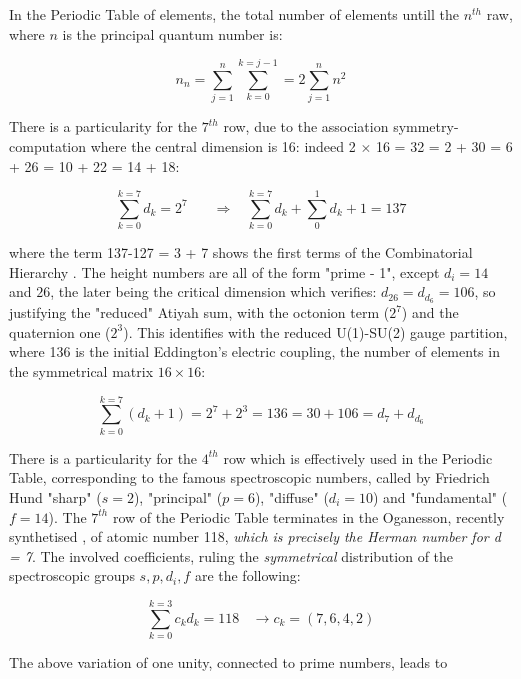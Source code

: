 \documentclass[a4paper,9pt]{article}
\newcounter{row}
\begin{document}
In the Periodic Table of elements, the total number of elements untill the $n^{th}$ raw, where $n$ is the principal quantum number is:

\begin{equation}\label{Eq46}
n_n = \sum _{j=1}^{n}  \sum_{k=0}^{k=j-1} = 2 \sum _{j=1}^{n} n^2
 \end{equation}

There is a particularity for the $7^{th}$ row, due to the association symmetry-computation where the central dimension is 16: indeed 2 $\times$ 16 = 32 = 2 + 30 = 6 + 26 = 10 + 22 = 14 + 18:  

\begin{equation}\label{Eq47}
 \sum_{k=0}^{k=7} d_k = 2^7~~~~~~~~\Rightarrow~~~~  \sum_{k=0}^{k=7} d_k + \sum_0^1{d_k + 1} = 137
 \end{equation}

 where the term 137-127 = 3 + 7 shows the first terms of the Combinatorial Hierarchy \cite{Bastin}. The height numbers are all of the form "prime - 1", except $d_i = 14$ and $26$, the later being the critical dimension which verifies: $ d_{26} = d_{d_6} = 106 $, so justifying the "reduced" Atiyah sum, with the octonion term ($2^7$) and the quaternion one ($2^3$). This identifies with the reduced U(1)-SU(2) gauge partition, where 136 is the initial Eddington's electric coupling, the number of elements in the symmetrical matrix $16\times16$: 

\begin{equation}\label{Eq48}
 \sum_{k=0}^{k=7} (d_k+1)= 2^7 + 2^3 = 136 = 30 + 106 = d_7 + d_{d_6}
 \end{equation}
  

There is a particularity for the $4^{th}$ row which is effectively used in the Periodic Table, corresponding to the famous spectroscopic numbers, called by Friedrich Hund "sharp" ($s = 2$), "principal" ($p = 6$), "diffuse" ($d_i = 10$) and "fundamental" ($f = 14$). The $7^{th}$ row of the Periodic Table terminates in the Oganesson, recently synthetised \cite{Oganessian}, of atomic number 118, \textit{which is precisely the Herman number for d = 7}. The involved coefficients, ruling the \textit{symmetrical} distribution of the spectroscopic groups $s,p,d_i,f$ are the following:

\begin{equation}\label{Eq49}
 \sum_{k=0}^{k=3} c_k d_k = 118 ~~~~ \rightarrow   c_k = (7,6,4,2)
 \end{equation}

The above variation of one unity, connected to prime numbers, leads to
\end{document}
